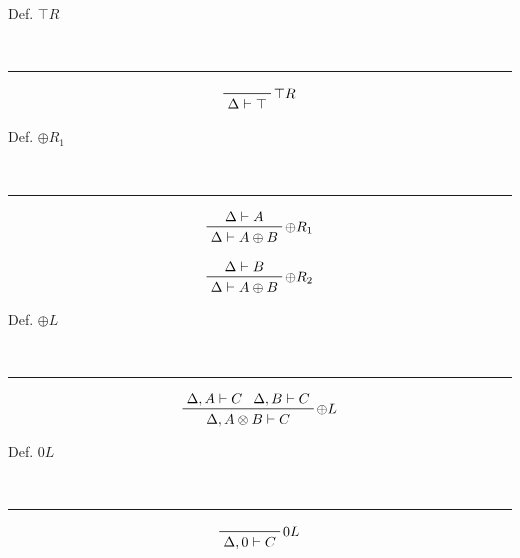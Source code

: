 \begin{note}
  \begin{field}
    Def. $\top R$
  \end{field} \\
  \noindent\rule[0.5ex]{\linewidth}{1pt}
  \begin{field}
    \[
      \prftree[r]
      {$\top R$}
      {\Delta\vdash\top}
    \]
  \end{field}
\end{note}

\begin{note}
  \begin{field}
    Def. $\oplus R_1$
  \end{field} \\
  \noindent\rule[0.5ex]{\linewidth}{1pt}
  \begin{field}
    \[ 
      \prftree[r]
      {$\oplus R_1$}
      {\Delta\vdash A}
      {\Delta\vdash A\oplus B}
    \] 

    \[ 
      \prftree[r]
      {$\oplus R_2$}
      {\Delta\vdash B}
      {\Delta\vdash A\oplus B}
    \] 
  \end{field}
\end{note}


\begin{note}
  \begin{field}
    Def. $\oplus L$
  \end{field} \\
  \noindent\rule[0.5ex]{\linewidth}{1pt}
  \begin{field}
    \[ 
      \prftree[r]
      {$\oplus L$}
      {\Delta, A\vdash C}
      {\Delta, B\vdash C}
      {\Delta, A\otimes B\vdash C}
    \] 
  \end{field}
\end{note}


\begin{note}
  \begin{field}
    Def. $0 L$
  \end{field} \\
  \noindent\rule[0.5ex]{\linewidth}{1pt}
  \begin{field}
    \[
      \prftree[r]
      {$0L$}
      {\Delta, 0\vdash C}
    \]
  \end{field}
\end{note}

